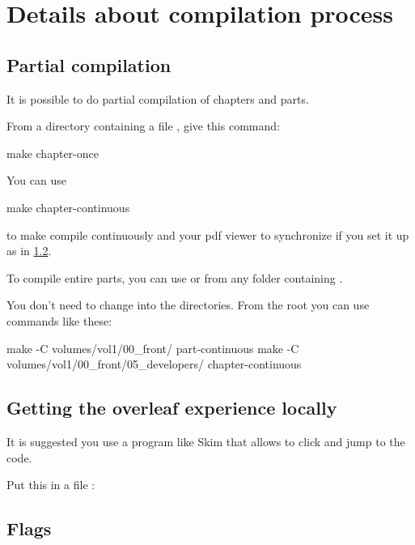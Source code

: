 \section{Details about compilation process}

\subsection{Partial compilation}

It is possible to do partial compilation of chapters and parts.


From a directory containing a file , give this command:

\begin{console}
    make chapter-once
\end{console}

You can use
%
\begin{console}
    make chapter-continuous
\end{console}
%
to make  compile continuously and your pdf viewer to synchronize if you set it up as in \cref{sub:overleaf-experience}.

To compile entire parts, you can use  or  from any folder containing
.

You don't need to change into the directories.
From the root you can use commands like these:
%
\begin{console}
    make -C volumes/vol1/00_front/ part-continuous
    make -C volumes/vol1/00_front/05_developers/ chapter-continuous
\end{console}

\subsection{Getting the overleaf experience locally}
\label{sub:overleaf-experience}
It is suggested you use a program like Skim that allows to click and jump to the code.

Put this in a file :


\subsection{Flags}

